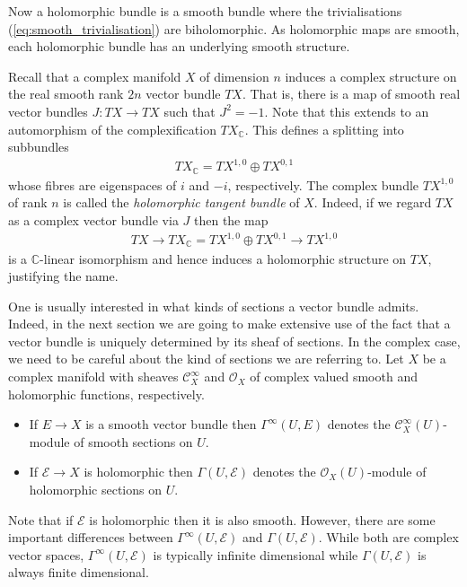 \documentclass[12pt]{ociamthesis}  %
\begin{document}
Now a holomorphic bundle is a smooth bundle where the trivialisations
(\ref{eq:smooth_trivialisation}) are biholomorphic. As holomorphic
maps are smooth, each holomorphic bundle has an underlying smooth
structure.

\begin{example}
  Recall that a complex manifold $X$ of dimension $n$ induces a
  complex structure on the real smooth rank $2n$ vector bundle $TX$.
  That is, there is a map of smooth real vector bundles
  $J : TX \to TX$ such that $J^2 = -1$. Note that this extends to
  an automorphism of the complexification $TX_{\mathbb{C}}$.
  This defines a splitting into subbundles
  \begin{align}\label{eq:tangent_decomposition}
    TX_{\mathbb{C}}  = TX^{1,0} \oplus TX^{0,1}
  \end{align}
  whose fibres are eigenspaces of $i$ and $-i$, respectively. The
  complex bundle $TX^{1,0}$ of rank $n$ is called the
  \emph{holomorphic tangent bundle} of $X$. Indeed, if we regard $TX$
  as a complex vector bundle via $J$ then the map
  \begin{align}\label{eq:holomorphic_tangent_bundle}
    TX
    \longrightarrow TX_{\mathbb C}
    = TX^{1,0} \oplus TX^{0,1}
    \longrightarrow TX^{1,0}
  \end{align}
  is a $\mathbb{C}$-linear isomorphism and hence induces a holomorphic
  structure on $TX$, justifying the name.
\end{example}

One is usually interested in what kinds of sections a vector bundle
admits. Indeed, in the next section we are going to make extensive use
of the fact that a vector bundle is uniquely determined by its sheaf
of sections. In the complex case, we need to be careful about the
kind of sections we are referring to. Let $X$ be a complex manifold
with sheaves $\mathscr C^\infty_X$ and $\mathscr O_X$ of complex
valued smooth and holomorphic functions, respectively.

\begin{itemize}
  \item If $E\to X$ is a smooth vector bundle then $\Gamma^\infty(U,E)$
        denotes the $\mathscr C^\infty_X(U)$-module of smooth sections on $U$.
  \item If $\mathcal E\to X$ is holomorphic then $\Gamma(U,\mathcal E)$
        denotes the $\mathscr O_X(U)$-module of holomorphic sections
        on $U$.
\end{itemize}

Note that if $\mathcal E$ is holomorphic then it is also smooth.
However, there are some important differences between
$\Gamma^\infty(U,\mathcal E)$ and $\Gamma(U,\mathcal E)$. While both are
complex vector spaces, $\Gamma^\infty(U,\mathcal E)$ is typically infinite
dimensional while $\Gamma(U,\mathcal E)$ is always finite
dimensional.~\cite[Theorem 1.4.1]{ma2007}
\end{document}
